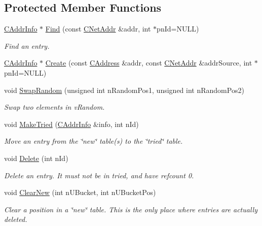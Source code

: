 \subsection*{Protected Member Functions}
\begin{DoxyCompactItemize}
\item 
\hyperlink{class_c_addr_info}{C\+Addr\+Info} $\ast$ \hyperlink{class_c_addr_man_ac961ead1a1afde144fc486b6d7c7369d}{Find} (const \hyperlink{class_c_net_addr}{C\+Net\+Addr} \&addr, int $\ast$pn\+Id=N\+U\+L\+L)
\begin{DoxyCompactList}\small\item\em Find an entry. \end{DoxyCompactList}\item 
\hyperlink{class_c_addr_info}{C\+Addr\+Info} $\ast$ \hyperlink{class_c_addr_man_aac93f51c0580e38a950a0f63b053bedb}{Create} (const \hyperlink{class_c_address}{C\+Address} \&addr, const \hyperlink{class_c_net_addr}{C\+Net\+Addr} \&addr\+Source, int $\ast$pn\+Id=N\+U\+L\+L)
\item 
void \hyperlink{class_c_addr_man_a3074bc8e3dcfb5348054613f575dc38e}{Swap\+Random} (unsigned int n\+Random\+Pos1, unsigned int n\+Random\+Pos2)
\begin{DoxyCompactList}\small\item\em Swap two elements in v\+Random. \end{DoxyCompactList}\item 
void \hyperlink{class_c_addr_man_a98e8383efb48b7c2932795438f35a10a}{Make\+Tried} (\hyperlink{class_c_addr_info}{C\+Addr\+Info} \&info, int n\+Id)
\begin{DoxyCompactList}\small\item\em Move an entry from the \char`\"{}new\char`\"{} table(s) to the \char`\"{}tried\char`\"{} table. \end{DoxyCompactList}\item 
void \hyperlink{class_c_addr_man_af488eac123030538770dbc4e3b16eb74}{Delete} (int n\+Id)
\begin{DoxyCompactList}\small\item\em Delete an entry. It must not be in tried, and have refcount 0. \end{DoxyCompactList}\item 
void \hyperlink{class_c_addr_man_ab283de3e750f006c85573976bd40da81}{Clear\+New} (int n\+U\+Bucket, int n\+U\+Bucket\+Pos)
\begin{DoxyCompactList}\small\item\em Clear a position in a \char`\"{}new\char`\"{} table. This is the only place where entries are actually deleted. \end{DoxyCompactList}\item 

\end{DoxyCompactItemize}
